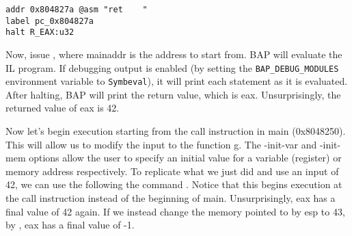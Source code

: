 \begin{verbatim}
addr 0x804827a @asm "ret    "
label pc_0x804827a
halt R_EAX:u32
\end{verbatim}

Now, issue , where
mainaddr is the address to start from.  BAP will evaluate the IL
program.  If debugging output is enabled (by setting the
\texttt{BAP\_DEBUG\_MODULES} environment variable to
\texttt{Symbeval}), it will print each statement as it is evaluated.
After halting, BAP will print the return value, which is
eax. Unsurprisingly, the returned value of eax is 42.

Now let's begin execution starting from the call instruction in main
(0x8048250). This will allow us to modify the input to the function
g. The -init-var and -init-mem options allow the user to specify an
initial value for a variable (register) or memory address
respectively.  To replicate what we just did and use an input of 42,
we can use the following the command . Notice that this
begins execution at the call instruction instead of the beginning of
main.  Unsurprisingly, eax has a final value of 42 again.  If we
instead change the memory pointed to by esp to 43, by , eax has
a final value of -1.
